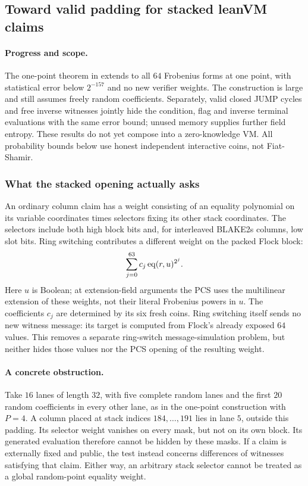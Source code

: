 \subsection{Toward valid padding for stacked leanVM claims}\label{note:zk-stacked-padding}

\paragraph{Progress and scope.} The one-point theorem in  extends to all $64$ Frobenius forms at one point, with statistical error below $2^{-157}$ and no new verifier weights. The construction is large and still assumes freely random coefficients. Separately, valid closed JUMP cycles and free inverse witnesses jointly hide the condition, flag and inverse terminal evaluations with the same error bound; unused memory supplies further field entropy. These results do not yet compose into a zero-knowledge VM. All probability bounds below use honest independent interactive coins, not Fiat-Shamir.

\subsubsection{What the stacked opening actually asks}

An ordinary column claim has a weight consisting of an equality polynomial on its variable coordinates times selectors fixing its other stack coordinates. The selectors include both high block bits and, for interleaved BLAKE2s columns, low slot bits. Ring switching contributes a different weight on the packed Flock block:
\[
 \sum_{j=0}^{63} c_j\operatorname{eq}(r,u)^{2^j}.
\]
Here $u$ is Boolean; at extension-field arguments the PCS uses the multilinear extension of these weights, not their literal Frobenius powers in $u$. The coefficients $c_j$ are determined by its six fresh coins. Ring switching itself sends no new witness message: its target is computed from Flock's already exposed $64$ values. This removes a separate ring-switch message-simulation problem, but neither hides those values nor the PCS opening of the resulting weight.

\paragraph{A concrete obstruction.} Take $16$ lanes of length $32$, with five complete random lanes and the first $20$ random coefficients in every other lane, as in the one-point construction with $P=4$. A column placed at stack indices $184,\ldots,191$ lies in lane $5$, outside this padding. Its selector weight vanishes on every mask, but not on its own block. Its generated evaluation therefore cannot be hidden by these masks. If a claim is externally fixed and public, the test instead concerns differences of witnesses satisfying that claim. Either way, an arbitrary stack selector cannot be treated as a global random-point equality weight.

